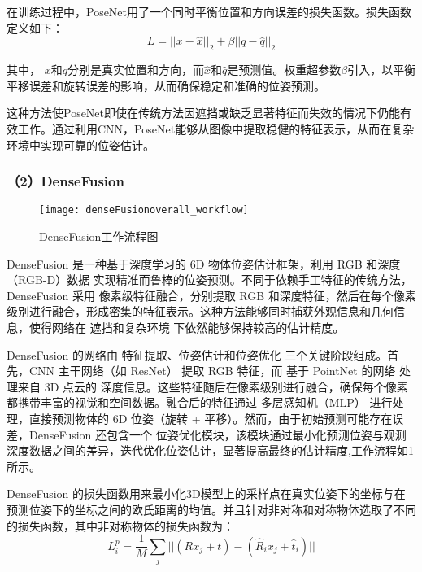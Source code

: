 在训练过程中，PoseNet用了一个同时平衡位置和方向误差的损失函数。损失函数定义如下：
\begin{equation}
	\label{equ:poseNet}
	L = || x - \hat{x} ||_{2} + \beta||q - \hat{q}||_{2}
\end{equation}

其中， $x$和$q$分别是真实位置和方向，而$\hat{x}$和$\hat{q}$是预测值。权重超参数$\beta$引入，以平衡平移误差和旋转误差的影响，从而确保稳定和准确的位姿预测。

这种方法使PoseNet即使在传统方法因遮挡或缺乏显著特征而失效的情况下仍能有效工作。通过利用CNN，PoseNet能够从图像中提取稳健的特征表示，从而在复杂环境中实现可靠的位姿估计。

 \subsubsection*{（2）DenseFusion}
  \begin{figure}[htb]
 	\texttt{[image: denseFusionoverall\_workflow]}
 	\caption[DenseFusion工作流程图]{DenseFusion工作流程图} %
 	\label{fig:denseFusionoverall_workflow}
 \end{figure}
 
DenseFusion 是一种基于深度学习的 6D 物体位姿估计框架，利用 RGB 和深度（RGB-D）数据 实现精准而鲁棒的位姿预测。不同于依赖手工特征的传统方法，DenseFusion 采用 像素级特征融合，分别提取 RGB 和深度特征，然后在每个像素级别进行融合，形成密集的特征表示。这种方法能够同时捕获外观信息和几何信息，使得网络在 遮挡和复杂环境 下依然能够保持较高的估计精度。

DenseFusion 的网络由 特征提取、位姿估计和位姿优化 三个关键阶段组成。首先，CNN 主干网络（如 ResNet） 提取 RGB 特征，而 基于 PointNet 的网络 处理来自 3D 点云的 深度信息。这些特征随后在像素级别进行融合，确保每个像素都携带丰富的视觉和空间数据。融合后的特征通过 多层感知机（MLP） 进行处理，直接预测物体的 6D 位姿（旋转 + 平移）。然而，由于初始预测可能存在误差，DenseFusion 还包含一个 位姿优化模块，该模块通过最小化预测位姿与观测深度数据之间的差异，迭代优化位姿估计，显著提高最终的估计精度,工作流程如\cref{fig:denseFusionoverall_workflow}所示。

DenseFusion 的损失函数用来最小化3D模型上的采样点在真实位姿下的坐标与在预测位姿下的坐标之间的欧氏距离的均值。并且针对非对称和对称物体选取了不同的损失函数，其中非对称物体的损失函数为：
\begin{equation}
	\label{equ:denseFusion_1}
	L^{p}_{i} = \frac{1}{M}\sum\limits_{j}||(Rx_{j} +t)-(\hat{R}_{i}x_{j} + \hat{t}_{i})||
\end{equation}

